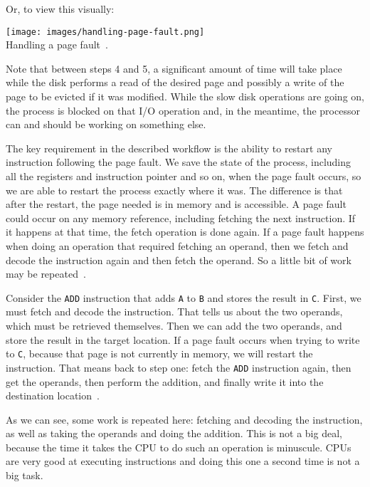 Or, to view this visually:

\begin{center}
\texttt{[image: images/handling-page-fault.png]}\\
Handling a page fault~\cite{osc}.
\end{center}

Note that between steps 4 and 5, a significant amount of time will take place while the disk performs a read of the desired page and possibly a write of the page to be evicted if it was modified. While the slow disk operations are going on, the process is blocked on that I/O operation and, in the meantime, the processor can and should be working on something else.

The key requirement in the described workflow is the ability to restart any instruction following the page fault. We save the state of the process, including all the registers and instruction pointer and so on, when the page fault occurs, so we are able to restart the process exactly where it was. The difference is that after the restart, the page needed is in memory and is accessible. A page fault could occur on any memory reference, including fetching the next instruction. If it happens at that time, the fetch operation is done again. If a page fault happens when doing an operation that required fetching an operand, then we fetch and decode the instruction again and then fetch the operand. So a little bit of work may be repeated~\cite{osc}.

Consider the \texttt{ADD} instruction that adds \texttt{A} to \texttt{B} and stores the result in \texttt{C}. First, we must fetch and decode the instruction. That tells us about the two operands, which must be retrieved themselves. Then we can add the two operands, and store the result in the target location. If a page fault occurs when trying to write to \texttt{C}, because that page is not currently in memory, we will restart the instruction. That means back to step one: fetch the \texttt{ADD} instruction again, then get the operands, then perform the addition, and finally write it into the destination location~\cite{osc}.

As we can see, some work is repeated here: fetching and decoding the instruction, as well as taking the operands and doing the addition. This is not a big deal, because the time it takes the CPU to do such an operation is minuscule. CPUs are very good at executing instructions and doing this one a second time is not a big task.

